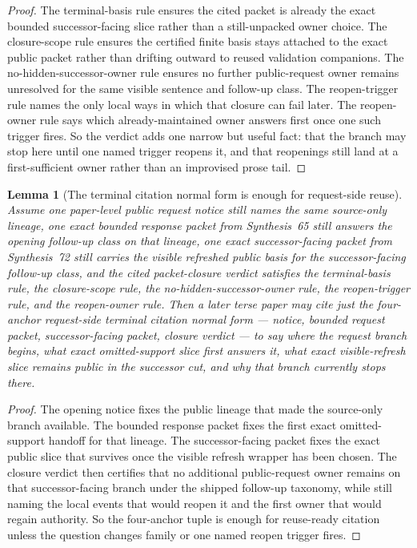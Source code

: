 \documentclass[11pt]{article}
\newtheorem{lemma}{Lemma}
\begin{document}
\begin{proof}
The terminal-basis rule ensures the cited packet is already the exact bounded successor-facing slice rather than a still-unpacked owner choice.
The closure-scope rule ensures the certified finite basis stays attached to the exact public packet rather than drifting outward to reused validation companions.
The no-hidden-successor-owner rule ensures no further public-request owner remains unresolved for the same visible sentence and follow-up class.
The reopen-trigger rule names the only local ways in which that closure can fail later.
The reopen-owner rule says which already-maintained owner answers first once one such trigger fires.
So the verdict adds one narrow but useful fact: that the branch may stop here until one named trigger reopens it, and that reopenings still land at a first-sufficient owner rather than an improvised prose tail.\qedhere
\end{proof}

\begin{lemma}[The terminal citation normal form is enough for request-side reuse]
Assume one paper-level public request notice still names the same source-only lineage, one exact bounded response packet from Synthesis~65 still answers the opening follow-up class on that lineage, one exact successor-facing packet from Synthesis~72 still carries the visible refreshed public basis for the successor-facing follow-up class, and the cited packet-closure verdict satisfies the terminal-basis rule, the closure-scope rule, the no-hidden-successor-owner rule, the reopen-trigger rule, and the reopen-owner rule.
Then a later terse paper may cite just the four-anchor request-side terminal citation normal form --- notice, bounded request packet, successor-facing packet, closure verdict --- to say where the request branch begins, what exact omitted-support slice first answers it, what exact visible-refresh slice remains public in the successor cut, and why that branch currently stops there.
\end{lemma}

\begin{proof}
The opening notice fixes the public lineage that made the source-only branch available.
The bounded response packet fixes the first exact omitted-support handoff for that lineage.
The successor-facing packet fixes the exact public slice that survives once the visible refresh wrapper has been chosen.
The closure verdict then certifies that no additional public-request owner remains on that successor-facing branch under the shipped follow-up taxonomy, while still naming the local events that would reopen it and the first owner that would regain authority.
So the four-anchor tuple is enough for reuse-ready citation unless the question changes family or one named reopen trigger fires.\qedhere
\end{proof}
\end{document}
